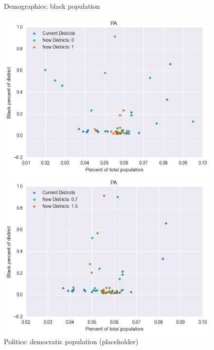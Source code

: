 \begin{figure}[htb!] \centering
\caption{ Demographics: black population }
\includegraphics[width=4.5in]{../analysis/PA/analysis_scatter.png}
\caption{ Politics: democratic population (placeholder)}
\includegraphics[width=4.5in]{../analysis/PA/analysis_scatter2.png}
\end{figure}

\clearpage
\newpage

